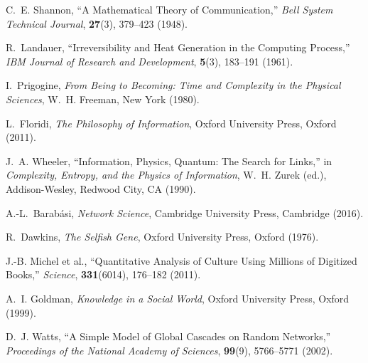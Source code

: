 \documentclass[12pt]{article}
\begin{document}
\begin{thebibliography}{99}

C.~E. Shannon, ``A Mathematical Theory of Communication,'' \emph{Bell System Technical Journal}, \textbf{27}(3), 379--423 (1948).

R.~Landauer, ``Irreversibility and Heat Generation in the Computing Process,'' \emph{IBM Journal of Research and Development}, \textbf{5}(3), 183--191 (1961).

I.~Prigogine, \emph{From Being to Becoming: Time and Complexity in the Physical Sciences}, W.~H. Freeman, New York (1980).

L.~Floridi, \emph{The Philosophy of Information}, Oxford University Press, Oxford (2011).

J.~A. Wheeler, ``Information, Physics, Quantum: The Search for Links,'' in \emph{Complexity, Entropy, and the Physics of Information}, W.~H. Zurek (ed.), Addison-Wesley, Redwood City, CA (1990).

A.-L.~Barabási, \emph{Network Science}, Cambridge University Press, Cambridge (2016).

R.~Dawkins, \emph{The Selfish Gene}, Oxford University Press, Oxford (1976).

J.-B. Michel et al., ``Quantitative Analysis of Culture Using Millions of Digitized Books,'' \emph{Science}, \textbf{331}(6014), 176--182 (2011).

A.~I. Goldman, \emph{Knowledge in a Social World}, Oxford University Press, Oxford (1999).

D.~J. Watts, ``A Simple Model of Global Cascades on Random Networks,'' \emph{Proceedings of the National Academy of Sciences}, \textbf{99}(9), 5766--5771 (2002).

\end{thebibliography}
\end{document}
